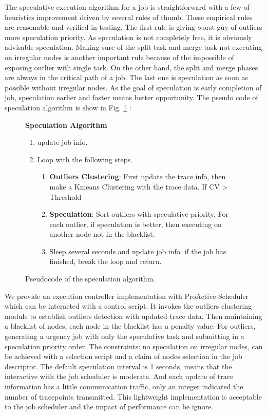 The speculative execution algorithm for a job is straightforward with a few of heuristics improvement driven by several rules of thumb. These empirical rules are reasonable and verified in testing. The first rule is giving worst guy of outliers more speculation priority. As speculation is not completely free, it is obviously advisable speculation. Making sure of the split task and merge task not executing on irregular nodes is another important rule because of the impossible of exposing outlier with single task. On the other hand, the split and merge phases are always in the critical path of a job. The last one is speculation as soon as possible without irregular nodes. As the goal of speculation is early completion of job, speculation earlier and faster means better opportunity. The pseudo code of speculation algorithm is show in Fig. \ref{fig-spec-algo} :

 \begin{figure}
\textbf{Speculation Algorithm}
\begin{enumerate}[(1)]
\setlength{\itemsep}{-\itemsep}
\item update job info.
\item Loop with the following steps.
\begin{enumerate}[]
\setlength{\itemsep}{-\itemsep}
\item \textbf{Outliers Clustering}: First update the trace info, then make a Kmeans Clustering with the trace data. If CV > Threshold
\item \textbf{Speculation}: Sort outliers with speculative priority. For each outlier, if speculation is better, then executing on another node not in the blacklist.
\item Sleep several seconds and update job info. if the job has finished, break the loop and return.
\end{enumerate}
\end{enumerate}
\caption{Pseudocode of the speculation algorithm.}
\label{fig-spec-algo}
\end{figure}

We provide an execution controller implementation with ProActive Scheduler which can be interacted with  a control script. It invokes the outliers clustering module to establish outliers detection with updated trace data. Then maintaining a blacklist of nodes, each node in the blacklist has a penalty value. For outliers, generating a urgency job with only the speculative task and submitting in a speculation priority order. The constraints: no speculation on irregular nodes, can be achieved with a selection script and a claim of nodes selection in the job descriptor. The default speculation interval is 1 seconds, means that the interactive with the job scheduler is moderate. And each update of trace information has a little communication traffic, only an integer indicated the number of  tracepoints transmitted. This lightweight implementation is acceptable to the job scheduler and the impact of performance can be ignore.
